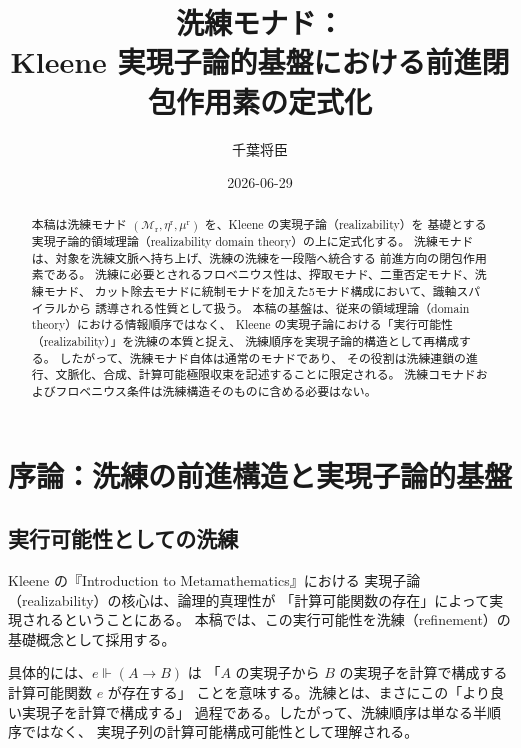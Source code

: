 \documentclass[11pt,a4paper]{article}
\theoremstyle{definition}
\newcommand{\Mr}{\mathcal{M}_{\mathrm{r}}}
\newcommand{\etar}{\eta^{\mathrm{r}}}
\newcommand{\mur}{\mu^{\mathrm{r}}}
\newcommand{\Real}{\Vdash}
\begin{document}
\title{洗練モナド：\\
Kleene 実現子論的基盤における前進閉包作用素の定式化}
\author{千葉将臣}
\date{2026-06-29}
\maketitle

\begin{abstract}
本稿は洗練モナド $(\Mr, \etar, \mur)$ を、Kleene の実現子論（realizability）を
基礎とする実現子論的領域理論（realizability domain theory）の上に定式化する。
洗練モナドは、対象を洗練文脈へ持ち上げ、洗練の洗練を一段階へ統合する
前進方向の閉包作用素である。
洗練に必要とされるフロベニウス性は、搾取モナド、二重否定モナド、洗練モナド、
カット除去モナドに統制モナドを加えた5モナド構成において、識軸スパイラルから
誘導される性質として扱う。
本稿の基盤は、従来の領域理論（domain theory）における情報順序ではなく、
Kleene の実現子論における「実行可能性（realizability）」を洗練の本質と捉え、
洗練順序を実現子論的構造として再構成する。
したがって、洗練モナド自体は通常のモナドであり、
その役割は洗練連鎖の進行、文脈化、合成、計算可能極限収束を記述することに限定される。
洗練コモナドおよびフロベニウス条件は洗練構造そのものに含める必要はない。
\end{abstract}

\tableofcontents
\newpage

\section{序論：洗練の前進構造と実現子論的基盤}

\subsection{実行可能性としての洗練}

Kleene \cite{Kleene1952} の『Introduction to Metamathematics』における
実現子論（realizability）の核心は、論理的真理性が
「計算可能関数の存在」によって実現されるということにある。
本稿では、この実行可能性を洗練（refinement）の基礎概念として採用する。

具体的には、$e \Real (A \to B)$ は
「$A$ の実現子から $B$ の実現子を計算で構成する計算可能関数 $e$ が存在する」
ことを意味する。洗練とは、まさにこの「より良い実現子を計算で構成する」
過程である。したがって、洗練順序は単なる半順序ではなく、
実現子列の計算可能構成可能性として理解される。
\end{document}

